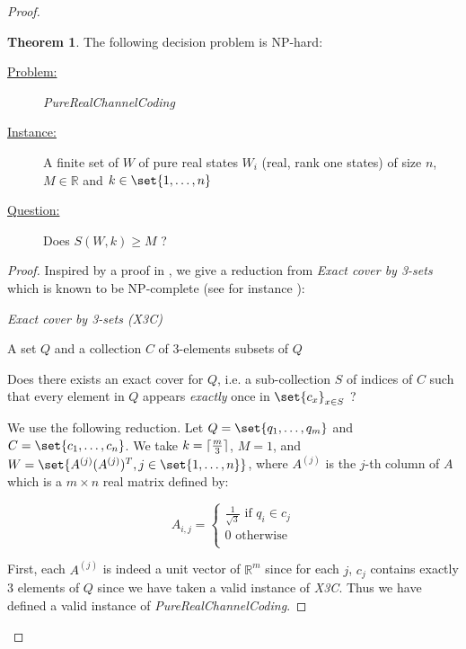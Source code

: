 \documentclass{article}
\theoremstyle{definition}
\newtheorem{theo}{Theorem}[section]
\theoremstyle{remark}
\DeclarePairedDelimiter\ceil{\lceil}{\rceil}
\begin{document}
\begin{proof}
     \begin{theo}
       The following decision problem is NP-hard:

       \begin{description}
         \item[\underline{Problem:}] \emph{PureRealChannelCoding}
         \item[\underline{Instance:}] A finite set of $W$ of pure real states $W_i$ (real, rank one states) of size $n$, $M \in \mathbb{R}$ and $k \in \set{1,\ldots,n}$
         \item[\underline{Question:}] Does $S(W,k) \geq M$ ?
       \end{description}
     \end{theo}

     \begin{proof}
       Inspired by a proof in \cite{CMi09}, we give a reduction from \emph{Exact cover by 3-sets} which is known to be NP-complete (see for instance \cite{GJ79}):

       \begin{description}
         \label{X3C}
         \item[\underline{Problem:}] \emph{Exact cover by 3-sets (X3C)}
         \item[\underline{Instance:}] A set $Q$ and a collection $C$ of 3-elements subsets of $Q$
         \item[\underline{Question:}] Does there exists an exact cover for $Q$, i.e. a sub-collection $S$ of indices of $C$ such that every element in $Q$ appears \emph{exactly} once in $\set{c_x}_{x \in S}$ ?
       \end{description}

       We use the following reduction. Let $Q = \set{q_1,\ldots,q_m}$ and $C = \set{c_1,\ldots,c_n}$.
       We take $k=\ceil{\frac{m}{3}}$, $M=1$, and $W = \set{A^{(j)}(A^{(j)})^T,j \in \set{1,\ldots,n}}$, where $A^{(j)}$ is the $j$-th column of $A$ which is a $m \times n$ real matrix defined by:

       \[A_{i,j} = \begin{cases}
         \frac{1}{\sqrt{3}} \text{ if } q_i \in c_j\\
         0 \text{ otherwise}\\
       \end{cases}
       \]

       First, each $A^{(j)}$ is indeed a unit vector of $\mathbb{R}^m$ since for each $j$, $c_j$ contains exactly $3$ elements of $Q$ since we have taken a valid instance of \emph{X3C}. Thus we have defined a valid instance of \emph{PureRealChannelCoding}.


\end{proof}
\end{proof}
\end{document}
